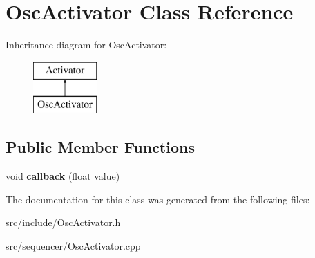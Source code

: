 \hypertarget{classOscActivator}{\section{Osc\-Activator Class Reference}
\label{classOscActivator}
}
Inheritance diagram for Osc\-Activator\-:\begin{figure}[H]
\begin{center}
\leavevmode
\includegraphics[height=2.000000cm]{classOscActivator}
\end{center}
\end{figure}
\subsection*{Public Member Functions}
\begin{DoxyCompactItemize}
\item 
\hypertarget{classOscActivator_ad5852376e949408b2fc13c8adf60c032}{void {\bfseries callback} (float value)}\label{classOscActivator_ad5852376e949408b2fc13c8adf60c032}

\end{DoxyCompactItemize}


The documentation for this class was generated from the following files\-:\begin{DoxyCompactItemize}
\item 
src/include/Osc\-Activator.\-h\item 
src/sequencer/Osc\-Activator.\-cpp\end{DoxyCompactItemize}
